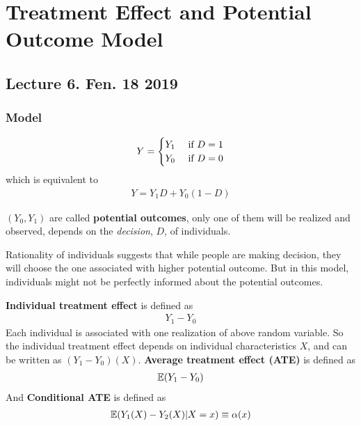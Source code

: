 \documentclass[11pt]{article}
\begin{document}
	\section{Treatment Effect and Potential Outcome Model}
		\subsection{Lecture 6. Fen. 18 2019}
			\subsubsection{Model}
				\begin{gather}
					Y = \begin{cases}
						Y_1 &\text{{ if }} D = 1 \\
						Y_0 &\text{{ if }} D = 0
					\end{cases}
				\end{gather}
				which is equivalent to
				\begin{gather}
					Y = Y_1 D + Y_0 (1 - D)
				\end{gather}
				
				\begin{definition}
					$(Y_0, Y_1)$ are called \textbf{potential outcomes}, only one of them will be realized and observed, depends on the \emph{decision}, $D$, of individuals.
				\end{definition}
				
				\begin{remark}
					Rationality of individuals suggests that while people are making decision, they will choose the one associated with higher potential outcome. But in this model, individuals might not be perfectly informed about the potential outcomes.
				\end{remark}
				
				\begin{definition}
					\textbf{Individual treatment effect} is defined as
					\begin{gather}
						Y_1 - Y_0
					\end{gather} Each individual is associated with one realization of above random variable. So the individual treatment effect depends on individual characteristics $X$, and can be written as $(Y_1 - Y_0)(X)$.
					\textbf{Average treatment effect (ATE)} is defined as
					\begin{gather}
						\mathbb{E}({Y_1 - Y_0})
					\end{gather}
					And \textbf{Conditional ATE} is defined as 
					\begin{gather}
						\mathbb{E}({Y_1(X) - Y_2(X) | X = x}) \equiv \alpha(x)
					\end{gather}
				\end{definition}
				
\end{document}
